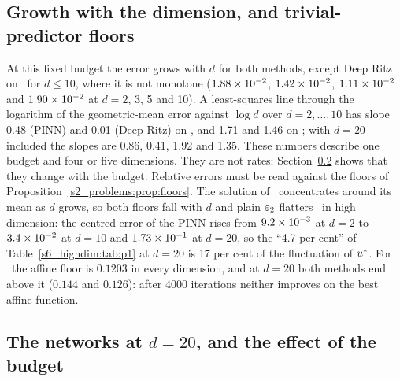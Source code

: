 \subsection{Growth with the dimension, and trivial-predictor floors}\label{s6_highdim:sec:growth}

At this fixed budget the error grows with $d$ for both methods, except Deep Ritz on \Pone\ for
$d\le10$, where it is not monotone ($1.88\times 10^{-2}$, $1.42\times 10^{-2}$, $1.11\times 10^{-2}$ and
$1.90\times 10^{-2}$ at $d=2$, 3, 5 and 10). A least-squares line through
the logarithm of the geometric-mean error against $\log d$ over $d=2,\dots,10$ has slope 0.48
(PINN) and 0.01 (Deep Ritz) on \Pone, and 1.71 and 1.46 on \Ptwo; with $d=20$ included the
slopes are 0.86, 0.41, 1.92 and 1.35. These numbers describe one budget and four or five
dimensions. They are not rates: Section~\ref{s6_highdim:sec:budget} shows that they change
with the budget.
Relative errors must be read against the floors of Proposition~\ref{s2_problems:prop:floors}.
The solution of \Pone\ concentrates around its mean as $d$ grows, so both floors fall with $d$
and plain $\varepsilon_{2}$ flatters \Pone\ in high dimension: the centred error of the PINN rises from
$9.2\times 10^{-3}$ at $d=2$ to $3.4\times 10^{-2}$ at $d=10$ and $1.73\times 10^{-1}$ at $d=20$, so the
``4.7 per cent'' of Table~\ref{s6_highdim:tab:p1} at $d=20$ is 17 per cent of the fluctuation
of $u^{*}$. For \Ptwo\ the affine floor is $0.1203$ in every dimension, and at $d=20$ both
methods end above it ($0.144$ and $0.126$): after 4000 iterations neither improves on the
best affine function.

\subsection{The networks at \texorpdfstring{$d=20$}{d = 20}, and the effect of the budget}%
\label{s6_highdim:sec:budget}

